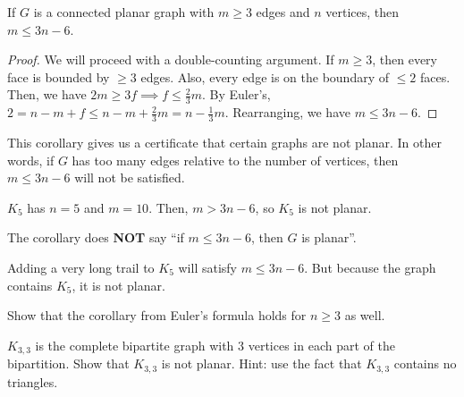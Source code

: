 \begin{corollary}
	If \( G \) is a connected planar graph with \( m\ge 3 \) edges and \( n \) vertices, then \( m \le 3n-6 \).
\end{corollary}

\begin{proof}
	We will proceed with a double-counting argument. If \( m\ge 3 \), then every face is bounded by \( \ge 3 \) edges. Also, every edge is on the boundary of \( \le 2 \) faces. Then, we have \( 2m \ge 3f \implies f \le \frac{2}{3}m \). By Euler's, \( 2 = n-m+f\le n-m+\frac{2}{3}m = n - \frac{1}{3}m\). Rearranging, we have \( m \le 3n - 6 \).
\end{proof}

This corollary gives us a certificate that certain graphs are not planar. In other words, if \( G \) has too many edges relative to the number of vertices, then \( m \le 3n-6 \) will not be satisfied.

\begin{eg}
	\( K_5 \) has \( n=5 \) and \( m=10 \). Then, \( m > 3n-6 \), so \( K_5 \) is not planar.
\end{eg}

\begin{note}
	The corollary does \textbf{NOT} say ``if \( m \le  3n - 6 \), then \( G \) is planar''.
\end{note}

\begin{eg}
	Adding a very long trail to \( K_5 \) will satisfy \( m\le 3n-6 \). But because the graph contains \( K_5 \), it is not planar.
\end{eg}

Show that the corollary from Euler's formula holds for \( n\ge 3 \) as well.

\( K_{3,3} \) is the complete bipartite graph with 3 vertices in each part of the bipartition. Show that \( K_{3,3} \) is not planar. Hint: use the fact that \( K_{3,3} \) contains no triangles.
